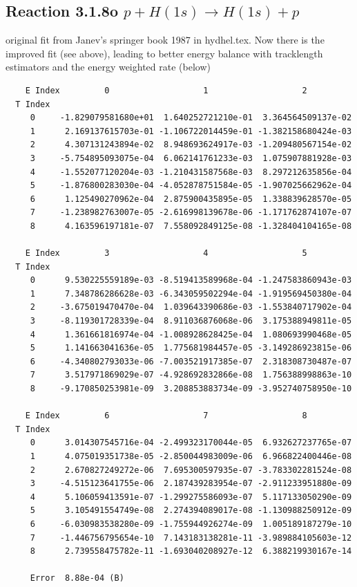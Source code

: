 \documentclass[12pt,dvips]{article}
\begin{document}
\subsection{
Reaction 3.1.8o $ p + H(1s) \rightarrow H(1s) + p   $
}
original fit from Janev's springer book 1987
in hydhel.tex. Now there is the improved fit (see above), leading to better
energy balance with tracklength estimators and the energy weighted rate (below)

\begin{small}\begin{verbatim}
    E Index         0                   1                   2
  T Index
     0     -1.829079581680e+01  1.640252721210e-01  3.364564509137e-02
     1      2.169137615703e-01 -1.106722014459e-01 -1.382158680424e-03
     2      4.307131243894e-02  8.948693624917e-03 -1.209480567154e-02
     3     -5.754895093075e-04  6.062141761233e-03  1.075907881928e-03
     4     -1.552077120204e-03 -1.210431587568e-03  8.297212635856e-04
     5     -1.876800283030e-04 -4.052878751584e-05 -1.907025662962e-04
     6      1.125490270962e-04  2.875900435895e-05  1.338839628570e-05
     7     -1.238982763007e-05 -2.616998139678e-06 -1.171762874107e-07
     8      4.163596197181e-07  7.558092849125e-08 -1.328404104165e-08

    E Index         3                   4                   5
  T Index
     0      9.530225559189e-03 -8.519413589968e-04 -1.247583860943e-03
     1      7.348786286628e-03 -6.343059502294e-04 -1.919569450380e-04
     2     -3.675019470470e-04  1.039643390686e-03 -1.553840717902e-04
     3     -8.119301728339e-04  8.911036876068e-06  3.175388949811e-05
     4      1.361661816974e-04 -1.008928628425e-04  1.080693990468e-05
     5      1.141663041636e-05  1.775681984457e-05 -3.149286923815e-06
     6     -4.340802793033e-06 -7.003521917385e-07  2.318308730487e-07
     7      3.517971869029e-07 -4.928692832866e-08  1.756388998863e-10
     8     -9.170850253981e-09  3.208853883734e-09 -3.952740758950e-10

    E Index         6                   7                   8
  T Index
     0      3.014307545716e-04 -2.499323170044e-05  6.932627237765e-07
     1      4.075019351738e-05 -2.850044983009e-06  6.966822400446e-08
     2      2.670827249272e-06  7.695300597935e-07 -3.783302281524e-08
     3     -4.515123641755e-06  2.187439283954e-07 -2.911233951880e-09
     4      5.106059413591e-07 -1.299275586093e-07  5.117133050290e-09
     5      3.105491554749e-08  2.274394089017e-08 -1.130988250912e-09
     6     -6.030983538280e-09 -1.755944926274e-09  1.005189187279e-10
     7     -1.446756795654e-10  7.143183138281e-11 -3.989884105603e-12
     8      2.739558475782e-11 -1.693040208927e-12  6.388219930167e-14

     Error  8.88e-04 (B)
\end{verbatim}\end{small}
\end{document}
